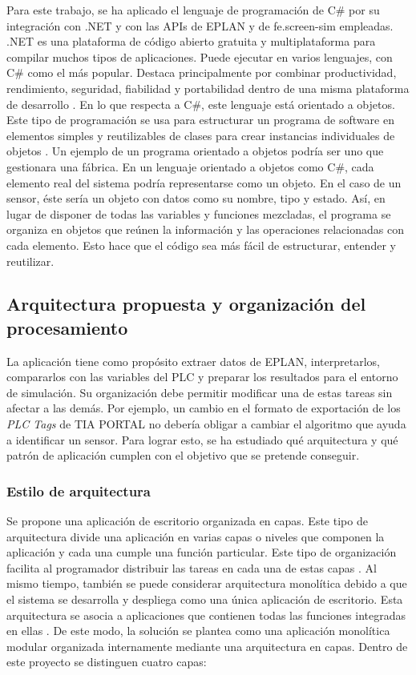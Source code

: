 Para este trabajo, se ha aplicado el lenguaje de programación de C\# por su integración con .NET y con las APIs de EPLAN y de fe.screen-sim empleadas. .NET es una plataforma de código abierto gratuita y multiplataforma para compilar muchos tipos de aplicaciones. Puede ejecutar en varios lenguajes, con C\# como el más popular. Destaca principalmente por combinar productividad, rendimiento, seguridad, fiabilidad y portabilidad dentro de una misma plataforma de desarrollo . En lo que respecta a C\#, este lenguaje está orientado a objetos. Este tipo de programación se usa para estructurar un programa de software en elementos simples y reutilizables de clases para crear instancias individuales de objetos . Un ejemplo de un programa orientado a objetos podría ser uno que gestionara una fábrica. En un lenguaje orientado a objetos como C\#, cada elemento real del sistema podría representarse como un objeto. En el caso de un sensor, éste sería un objeto con datos como su nombre, tipo y estado. Así, en lugar de disponer de todas las variables y funciones mezcladas, el programa se organiza en objetos que reúnen la información y las operaciones relacionadas con cada elemento. Esto hace que el código sea más fácil de estructurar, entender y reutilizar. \\


\subsection{Arquitectura propuesta y organización del procesamiento} \label{subsec:metodologia}

La aplicación tiene como propósito extraer datos de EPLAN, interpretarlos, compararlos con las variables del PLC y preparar los resultados para el entorno de simulación. Su organización debe permitir modificar una de estas tareas sin afectar a las demás. Por ejemplo, un cambio en el formato de exportación de los \textit{PLC Tags} de TIA PORTAL no debería obligar a cambiar el algoritmo que ayuda a identificar un sensor. Para lograr esto, se ha estudiado qué arquitectura y qué patrón de aplicación cumplen con el objetivo que se pretende conseguir. 


\subsubsection{Estilo de arquitectura}

Se propone una aplicación de escritorio organizada en capas. Este tipo de arquitectura divide una aplicación en varias capas o niveles que componen la aplicación y cada una cumple una función particular. Este tipo de organización facilita al programador distribuir las tareas en cada una de estas capas . Al mismo tiempo, también se puede considerar  arquitectura monolítica debido a que el sistema se desarrolla y despliega como una única aplicación de escritorio. Esta arquitectura se asocia a aplicaciones que contienen todas las funciones integradas en ellas . De este modo, la solución se plantea como una aplicación monolítica modular organizada internamente mediante una arquitectura en capas. Dentro de este proyecto se distinguen cuatro capas:


